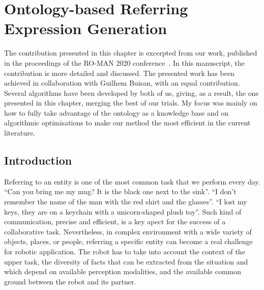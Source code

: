 \ifdefined{}
\else
\setcounter{chapter}{4} %
\dominitoc
\faketableofcontents
\fi

\chapter{Ontology-based Referring Expression Generation}
\label{chap:4}
\minitoc

The contribution presented in this chapter is excerpted from our work, published in the proceedings of the RO-MAN 2020 conference~\cite{buisan_2020_efficient}. In this manuscript, the contribution is more detailed and discussed. The presented work has been achieved in collaboration with Guilhem Buisan, with an equal contribution. Several algorithms have been developed by both of us, giving, as a result, the one presented in this chapter, merging the best of our trials. My focus was mainly on how to fully take advantage of the ontology as a knowledge base and on algorithmic optimisations to make our method the most efficient in the current literature.

\section{Introduction}

Referring to an entity is one of the most common task that we perform every day. ``Can you bring me my mug? It is the black one next to the sink''. ``I don't remember the name of the man with the red shirt and the glasses''. ``I lost my keys, they are on a keychain with a unicorn-shaped plush toy''. Such kind of communication, precise and efficient, is a key apect for the success of a collaborative task. Nevertheless, in complex environment with a wide variety of objects, places, or people, referring a specific entity can become a real challenge for robotic application. The robot has to take into account the context of the upper task, the diversity of facts that can be extracted from the situation and which depend on available perception modalities, and the available common ground between the robot and its partner. 

